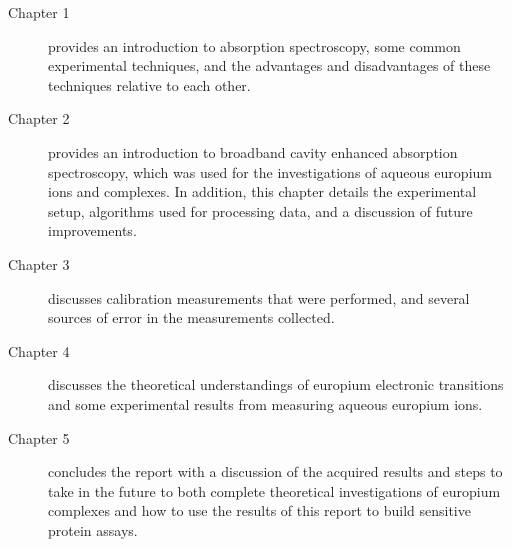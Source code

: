 \begin{description}
  \item[Chapter 1] provides an introduction to absorption spectroscopy, some
    common experimental techniques, and the advantages and disadvantages of
    these techniques relative to each other.
  \item[Chapter 2] provides an introduction to broadband cavity enhanced
    absorption spectroscopy, which was used for the investigations of aqueous
    europium ions and complexes. In addition, this chapter details the
    experimental setup, algorithms used for processing data, and a discussion
    of future improvements.
  \item[Chapter 3] discusses calibration measurements that were performed, and
    several sources of error in the measurements collected.
  \item[Chapter 4] discusses the theoretical understandings of europium
    electronic transitions and some experimental results from measuring
    aqueous europium ions.
  \item[Chapter 5] concludes the report with a discussion of the acquired
    results and steps to take in the future to both complete theoretical
    investigations of europium complexes and how to use the results of
    this report to build sensitive protein assays.
\end{description}
